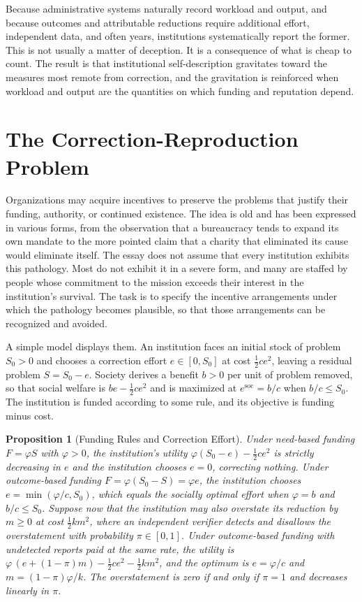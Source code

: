 \documentclass[11pt]{report}
\newtheorem{proposition}[theorem]{Proposition}
\theoremstyle{definition}
\theoremstyle{remark}
\begin{document}
Because administrative systems naturally record workload and output, and because outcomes and attributable reductions require additional effort, independent data, and often years, institutions systematically report the former. This is not usually a matter of deception. It is a consequence of what is cheap to count. The result is that institutional self-description gravitates toward the measures most remote from correction, and the gravitation is reinforced when workload and output are the quantities on which funding and reputation depend.

\section{The Correction-Reproduction Problem}

Organizations may acquire incentives to preserve the problems that justify their funding, authority, or continued existence. The idea is old and has been expressed in various forms, from the observation that a bureaucracy tends to expand its own mandate to the more pointed claim that a charity that eliminated its cause would eliminate itself. The essay does not assume that every institution exhibits this pathology. Most do not exhibit it in a severe form, and many are staffed by people whose commitment to the mission exceeds their interest in the institution's survival. The task is to specify the incentive arrangements under which the pathology becomes plausible, so that those arrangements can be recognized and avoided.

A simple model displays them. An institution faces an initial stock of problem $S_0>0$ and chooses a correction effort $e\in[0,S_0]$ at cost $\tfrac12ce^2$, leaving a residual problem $S=S_0-e$. Society derives a benefit $b>0$ per unit of problem removed, so that social welfare is $be-\tfrac12ce^2$ and is maximized at $e^{\mathrm{soc}}=b/c$ when $b/c\le S_0$. The institution is funded according to some rule, and its objective is funding minus cost.

\begin{proposition}[Funding Rules and Correction Effort]\label{prop:funding}
Under need-based funding $F=\varphi S$ with $\varphi>0$, the institution's utility $\varphi(S_0-e)-\tfrac12ce^2$ is strictly decreasing in $e$ and the institution chooses $e=0$, correcting nothing. Under outcome-based funding $F=\varphi(S_0-S)=\varphi e$, the institution chooses $e=\min(\varphi/c,S_0)$, which equals the socially optimal effort when $\varphi=b$ and $b/c\le S_0$. Suppose now that the institution may also overstate its reduction by $m\ge0$ at cost $\tfrac12km^2$, where an independent verifier detects and disallows the overstatement with probability $\pi\in[0,1]$. Under outcome-based funding with undetected reports paid at the same rate, the utility is $\varphi\,(e+(1-\pi)m)-\tfrac12ce^2-\tfrac12km^2$, and the optimum is $e=\varphi/c$ and $m=(1-\pi)\varphi/k$. The overstatement is zero if and only if $\pi=1$ and decreases linearly in $\pi$.
\end{proposition}
\end{document}
